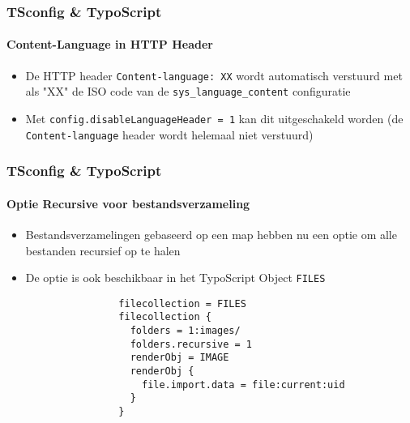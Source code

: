 \begin{frame}[fragile]
	\frametitle{TSconfig \& TypoScript}
	\framesubtitle{Content-Language in HTTP Header}

	\begin{itemize}

		\item De HTTP header \texttt{Content-language: XX} wordt automatisch verstuurd met als "XX" de ISO code van
			de \texttt{sys\_language\_content} configuratie

		\item Met \texttt{config.disableLanguageHeader = 1} kan dit uitgeschakeld worden
			(de \texttt{Content-language} header wordt helemaal niet verstuurd)

	\end{itemize}

\end{frame}


\begin{frame}[fragile]
	\frametitle{TSconfig \& TypoScript}
	\framesubtitle{Optie Recursive voor bestandsverzameling}

	\begin{itemize}

		\item Bestandsverzamelingen gebaseerd op een map hebben nu een optie om alle bestanden recursief op te halen

		\item De optie is ook beschikbaar in het TypoScript Object \texttt{FILES}

			\begin{lstlisting}
				filecollection = FILES
				filecollection {
				  folders = 1:images/
				  folders.recursive = 1
				  renderObj = IMAGE
				  renderObj {
				    file.import.data = file:current:uid
				  }
				}
			\end{lstlisting}

	\end{itemize}

\end{frame}

